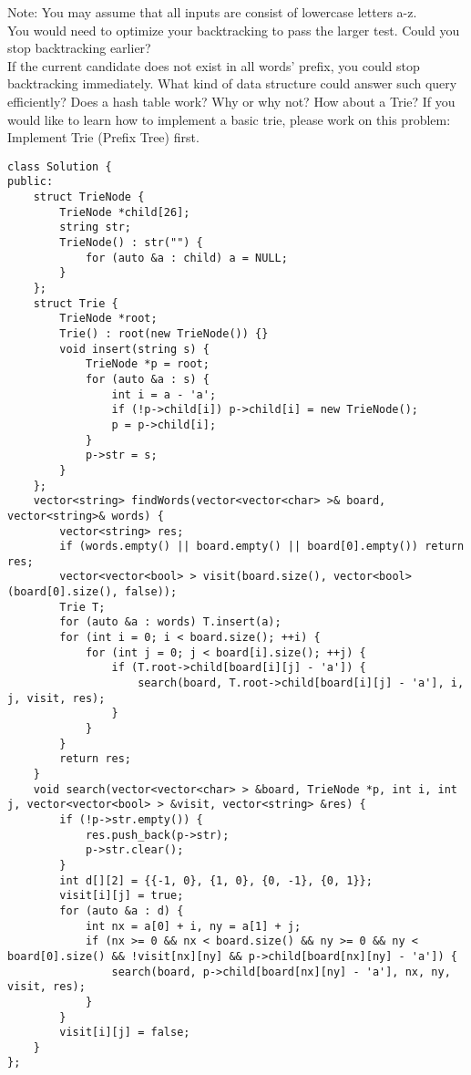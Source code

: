 Note:
You may assume that all inputs are consist of lowercase letters a-z.\\

You would need to optimize your backtracking to pass the larger test. Could you stop backtracking earlier?\\

If the current candidate does not exist in all words' prefix, you could stop backtracking immediately. What kind of data structure could answer such query efficiently? Does a hash table work? Why or why not? How about a Trie? If you would like to learn how to implement a basic trie, please work on this problem: Implement Trie (Prefix Tree) first.\\

\begin{lstlisting}
class Solution {
public:
    struct TrieNode {
        TrieNode *child[26];
        string str;
        TrieNode() : str("") {
            for (auto &a : child) a = NULL;
        }
    };
    struct Trie {
        TrieNode *root;
        Trie() : root(new TrieNode()) {}
        void insert(string s) {
            TrieNode *p = root;
            for (auto &a : s) {
                int i = a - 'a';
                if (!p->child[i]) p->child[i] = new TrieNode();
                p = p->child[i];
            }
            p->str = s;
        }
    };
    vector<string> findWords(vector<vector<char> >& board, vector<string>& words) {
        vector<string> res;
        if (words.empty() || board.empty() || board[0].empty()) return res;
        vector<vector<bool> > visit(board.size(), vector<bool>(board[0].size(), false));
        Trie T;
        for (auto &a : words) T.insert(a);
        for (int i = 0; i < board.size(); ++i) {
            for (int j = 0; j < board[i].size(); ++j) {
                if (T.root->child[board[i][j] - 'a']) {
                    search(board, T.root->child[board[i][j] - 'a'], i, j, visit, res);
                }
            }
        }
        return res;
    }
    void search(vector<vector<char> > &board, TrieNode *p, int i, int j, vector<vector<bool> > &visit, vector<string> &res) { 
        if (!p->str.empty()) {
            res.push_back(p->str);
            p->str.clear();
        }
        int d[][2] = {{-1, 0}, {1, 0}, {0, -1}, {0, 1}};
        visit[i][j] = true;
        for (auto &a : d) {
            int nx = a[0] + i, ny = a[1] + j;
            if (nx >= 0 && nx < board.size() && ny >= 0 && ny < board[0].size() && !visit[nx][ny] && p->child[board[nx][ny] - 'a']) {
                search(board, p->child[board[nx][ny] - 'a'], nx, ny, visit, res);
            }
        }
        visit[i][j] = false;
    }
};
\end{lstlisting}








